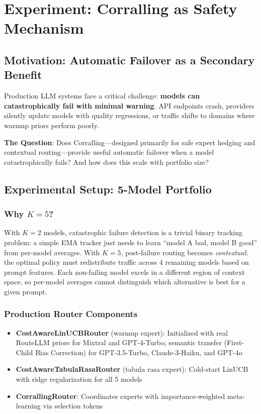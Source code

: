 
\section{Experiment: Corralling as Safety Mechanism}
\label{sec:corralling}

\subsection{Motivation: Automatic Failover as a Secondary Benefit}

Production LLM systems face a critical challenge: \textbf{models can catastrophically fail with minimal warning}. API endpoints crash, providers silently update models with quality regressions, or traffic shifts to domains where warmup priors perform poorly.

\textbf{The Question}: Does Corralling---designed primarily for safe expert hedging and contextual routing---provide useful automatic failover when a model catastrophically fails? And how does this scale with portfolio size?

\subsection{Experimental Setup: 5-Model Portfolio}

\subsubsection{Why $K=5$?}

With $K=2$ models, catastrophic failure detection is a trivial binary tracking problem: a simple EMA tracker just needs to learn ``model A bad, model B good'' from per-model averages. With $K=5$, post-failure routing becomes \emph{contextual}: the optimal policy must redistribute traffic across 4 remaining models based on prompt features. Each non-failing model excels in a different region of context space, so per-model averages cannot distinguish which alternative is best for a given prompt.

\subsubsection{Production Router Components}

\begin{itemize}
    \item \textbf{CostAwareLinUCBRouter} (warmup expert): Initialized with real RouteLLM priors for Mixtral and GPT-4-Turbo; semantic transfer (First-Child Bias Correction) for GPT-3.5-Turbo, Claude-3-Haiku, and GPT-4o
    \item \textbf{CostAwareTabulaRasaRouter} (tabula rasa expert): Cold-start LinUCB with ridge regularization for all 5 models
    \item \textbf{CorrallingRouter}: Coordinates experts with importance-weighted meta-learning via selection tokens
\end{itemize}

